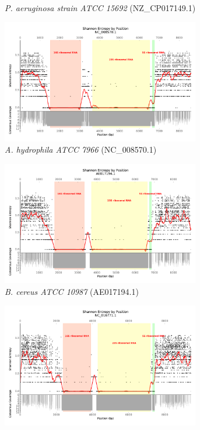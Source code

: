 \documentclass[10pt]{article}
\begin{document}
\begin{figure}[H]
\begin{subfigure}[b]{.45\textwidth}
    \caption{\textit{P. aeruginosa strain ATCC 15692} (NZ\_CP017149.1)}
    \label{fig:ent_pao}
  \end{subfigure}
  \begin{subfigure}[b]{.45\textwidth}
    \includegraphics[width=0.95\textwidth]{gage_entropy_figures/NC_008570.1_entropy_plot}
    \caption{\textit{A. hydrophila ATCC 7966} (NC\_008570.1)}
    \label{fig:ent_aero}
  \end{subfigure}
  \begin{subfigure}[b]{.45\textwidth}
    \includegraphics[width=0.95\textwidth]{gage_entropy_figures/AE017194.1_entropy_plot}
    \caption{\textit{B. cereus ATCC 10987} (AE017194.1)}
    \label{fig:ent_cereus_atcc}
  \end{subfigure}
  \begin{subfigure}[b]{.45\textwidth}
    \includegraphics[width=0.95\textwidth]{gage_entropy_figures/NC_016771.1_entropy_plot}

\end{subfigure}
\end{figure}
\end{document}

